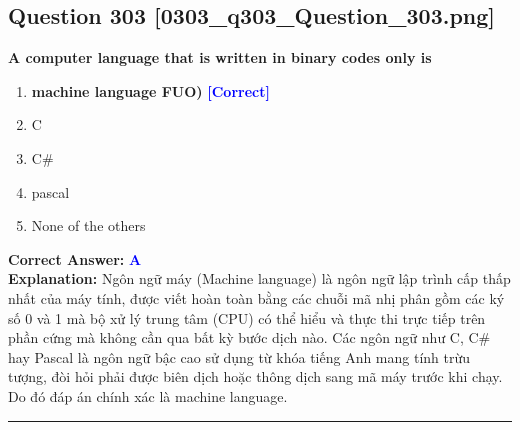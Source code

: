\documentclass[11pt,a4paper]{article}
\begin{document}
\begin{minipage}{\textwidth}
\subsection*{Question 303 \quad \footnotesize{[0303\_q303\_Question\_303.png]}}
\noindent \textbf{A computer language that is written in binary codes only is}

\begin{enumerate}[label=\Alph*.]
    \item \textbf{machine language FUO)} \hfill \textcolor{blue}{\textbf{[Correct]}}
    \item C
    \item C\#
    \item pascal
    \item None of the others
\end{enumerate}

\noindent \textbf{Correct Answer:} \textcolor{blue}{\textbf{A}} \\[2pt]
\noindent \textbf{Explanation:} Ngôn ngữ máy (Machine language) là ngôn ngữ lập trình cấp thấp nhất của máy tính, được viết hoàn toàn bằng các chuỗi mã nhị phân gồm các ký số 0 và 1 mà bộ xử lý trung tâm (CPU) có thể hiểu và thực thi trực tiếp trên phần cứng mà không cần qua bất kỳ bước dịch nào. Các ngôn ngữ như C, C\# hay Pascal là ngôn ngữ bậc cao sử dụng từ khóa tiếng Anh mang tính trừu tượng, đòi hỏi phải được biên dịch hoặc thông dịch sang mã máy trước khi chạy. Do đó đáp án chính xác là machine language.

\par\vspace{0.3cm}
\hrule
\vspace{0.3cm}
\end{minipage}
\end{document}
